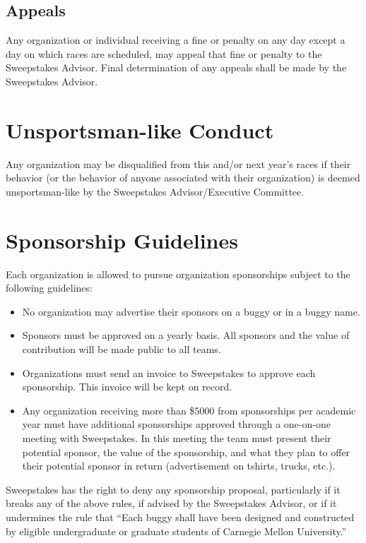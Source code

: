 \subsection{Appeals}

	Any organization or individual receiving a fine or penalty on any day except a day on which races are scheduled, may appeal that fine or penalty to the Sweepstakes Advisor. Final determination of any appeals shall be made by the Sweepstakes Advisor.

\section{Unsportsman-like Conduct}

	Any organization may be disqualified from this and/or next year's races if their behavior (or the behavior of anyone associated with their organization) is deemed unsportsman-like by the Sweepstakes Advisor/Executive Committee.

\section{Sponsorship Guidelines}

	Each organization is allowed to pursue organization sponsorships subject to the following guidelines:

	\begin{itemize}
		\item No organization may advertise their sponsors on a buggy or in a buggy name.
  
		\item Sponsors must be approved on a yearly basis. All sponsors and the value of contribution will be made public to all teams.

		\item Organizations must send an invoice to Sweepstakes to approve each sponsorship. This invoice will be kept on record.
  
		\item Any organization receiving more than \$5000 from sponsorships per academic year must have additional sponsorships approved through a one-on-one meeting with Sweepstakes. In this meeting the team must present their potential sponsor, the value of the sponsorship, and what they plan to offer their potential sponsor in return (advertisement on tshirts, trucks, etc.).
	\end{itemize}

	Sweepstakes has the right to deny any sponsorship proposal, particularly if it breaks any of the above rules, if advised by the Sweepstakes Advisor, or if it undermines the rule that “Each buggy shall have been designed and constructed by eligible undergraduate or graduate students of Carnegie Mellon University.”
